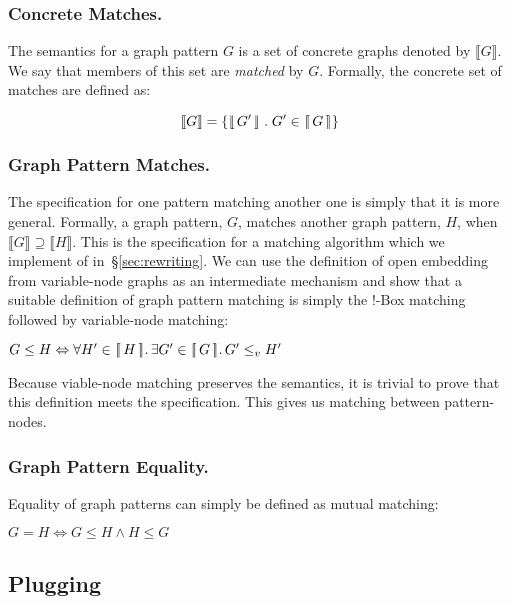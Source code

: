 \documentclass[runningheads]{llncs}
\newcommand{\vinterp}[1]{\lfloor\hspace{-0.27em}|\, #1\, |\hspace{-0.27em}\rfloor}
\newcommand{\binterp}[1]{\lceil\hspace{-0.27em}|\, #1\, |\hspace{-0.27em}\rceil}
\newcommand{\minterp}[1]{\llbracket #1 \rrbracket}
\begin{document}
\subsubsection{Concrete Matches.}

The semantics for a graph pattern $G$ is a set of concrete graphs
denoted by $\minterp{G}$. We say that members of this set are
\emph{matched} by $G$. Formally, the concrete set of matches are
defined as:

$$\minterp{G} = \{\vinterp{G'}\;.\; G' \in \binterp{G}\}$$

\subsubsection{Graph Pattern Matches.}

The specification for one pattern matching another one is simply that
it is more general. Formally, a graph pattern, $G$, matches another
graph pattern, $H$, when $\minterp{G} \supseteq \minterp{H}$. This is
the specification for a matching algorithm which we implement of
in~\S\ref{sec:rewriting}. We can use the definition of open embedding
from variable-node graphs as an intermediate mechanism and show that a
suitable definition of graph pattern matching is simply the !-Box
matching followed by variable-node matching:

\begin{definition}
  $G \leq H \Leftrightarrow \forall H' \in \binterp{H}.\,\exists G' \in \binterp{G}.\, G' \leq_v H'$
\end{definition}

Because viable-node matching preserves the semantics, it is trivial to
prove that this definition meets the specification. This gives us
matching between pattern-nodes.

\subsubsection{Graph Pattern Equality.}

Equality of graph patterns can simply be defined as mutual matching: 

\begin{definition}
  $G = H \Leftrightarrow G \leq H \land H \leq G$
\end{definition}


\subsection{Plugging}
\end{document}
